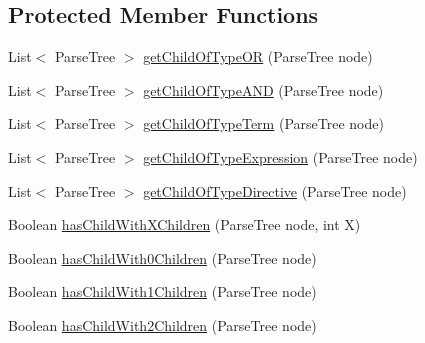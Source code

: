 \subsection*{Protected Member Functions}
\begin{DoxyCompactItemize}
\item 
List$<$ Parse\-Tree $>$ \hyperlink{classit_1_1emarolab_1_1cagg_1_1core_1_1language_1_1parser_1_1ANTLRInterface_1_1LogicalParserListener_af8167833698d8389ab13b314fa26b212}{get\-Child\-Of\-Type\-O\-R} (Parse\-Tree node)
\item 
List$<$ Parse\-Tree $>$ \hyperlink{classit_1_1emarolab_1_1cagg_1_1core_1_1language_1_1parser_1_1ANTLRInterface_1_1LogicalParserListener_a79ecb2968f1165fdb853a31d2b31d71c}{get\-Child\-Of\-Type\-A\-N\-D} (Parse\-Tree node)
\item 
List$<$ Parse\-Tree $>$ \hyperlink{classit_1_1emarolab_1_1cagg_1_1core_1_1language_1_1parser_1_1ANTLRInterface_1_1LogicalParserListener_a6ae2a5b8dcca6550d7ad250892a2a275}{get\-Child\-Of\-Type\-Term} (Parse\-Tree node)
\item 
List$<$ Parse\-Tree $>$ \hyperlink{classit_1_1emarolab_1_1cagg_1_1core_1_1language_1_1parser_1_1ANTLRInterface_1_1LogicalParserListener_a1443c2fa14afa934efac28a4b9c9f886}{get\-Child\-Of\-Type\-Expression} (Parse\-Tree node)
\item 
List$<$ Parse\-Tree $>$ \hyperlink{classit_1_1emarolab_1_1cagg_1_1core_1_1language_1_1parser_1_1ANTLRInterface_1_1LogicalParserListener_ae3d6f4db0eeb15293061a5269ef5b5f0}{get\-Child\-Of\-Type\-Directive} (Parse\-Tree node)
\item 
Boolean \hyperlink{classit_1_1emarolab_1_1cagg_1_1core_1_1language_1_1parser_1_1ANTLRInterface_1_1LogicalParserListener_a19c8615467f2354385db87f4a0287459}{has\-Child\-With\-X\-Children} (Parse\-Tree node, int X)
\item 
Boolean \hyperlink{classit_1_1emarolab_1_1cagg_1_1core_1_1language_1_1parser_1_1ANTLRInterface_1_1LogicalParserListener_ae0a5f8b7f8fcd41e3e8baf7ebb4ee66c}{has\-Child\-With0\-Children} (Parse\-Tree node)
\item 
Boolean \hyperlink{classit_1_1emarolab_1_1cagg_1_1core_1_1language_1_1parser_1_1ANTLRInterface_1_1LogicalParserListener_a351f569f0bd9bbf0b611e3888a06c00d}{has\-Child\-With1\-Children} (Parse\-Tree node)
\item 
Boolean \hyperlink{classit_1_1emarolab_1_1cagg_1_1core_1_1language_1_1parser_1_1ANTLRInterface_1_1LogicalParserListener_a1edeb17a0fabac3fc9be5eacbcd27896}{has\-Child\-With2\-Children} (Parse\-Tree node)

\end{DoxyCompactItemize}
